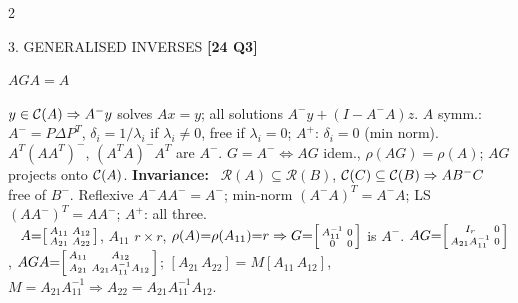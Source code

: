 \documentclass[10pt,a4paper]{article}
\newcommand{\spyq}[1]{{\tiny\color{Yellow}\textbf{[#1]}}}
\newcommand{\sect}[1]{\vspace{2pt}\noindent\colorbox{Blue!78}{\parbox{0.955\columnwidth}%
{\color{white}\bfseries\scriptsize\let\pyq\spyq\strut #1}}\vspace{1pt}\par}
\newcommand{\ssec}[1]{\textbf{\color{BrickRed}#1}\ }
\newcommand{\pyq}[1]{{\tiny\color{BrickRed}\textbf{[#1]}}}
\newcommand{\key}[1]{\par\vspace{0.8pt}\noindent\centerline{\adjustbox{max width=0.96\columnwidth}%
{\colorbox{Yellow!40}{$\displaystyle #1$}}}\vspace{0.8pt}\par}
\newcommand{\Rsp}{\mathcal{R}}\newcommand{\Yb}{\overline{Y}}\newcommand{\xb}{\bar{x}}
\begin{document}
\begin{multicols}{2}
\sect{3. GENERALISED INVERSES \pyq{24 Q3}}
\key{AGA=A}
$y\in\mathcal{C}(A)\Rightarrow A^-y$ solves $Ax{=}y$; all solutions $A^-y{+}(I{-}A^-A)z$.
$A$ symm.: $A^-{=}P\Delta P^T$, $\delta_i{=}1/\lambda_i$ if $\lambda_i{\ne}0$, free if $\lambda_i{=}0$; $A^+$: $\delta_i{=}0$ (min norm).
$A^T(AA^T)^-$, $(A^TA)^-A^T$ are $A^-$. $G{=}A^-\iff AG$ idem., $\rho(AG){=}\rho(A)$; $AG$ projects onto $\mathcal{C}(A)$.
\ssec{Invariance:} $\Rsp(A)\subseteq\Rsp(B)$, $\mathcal{C}(C)\subseteq\mathcal{C}(B)\Rightarrow AB^-C$ free of $B^-$.
Reflexive $A^-AA^-{=}A^-$; min-norm $(A^-A)^T{=}A^-A$; LS $(AA^-)^T{=}AA^-$; $A^+$: all three.\\
\ssec{\pyq{24 Q3}} $A{=}\begin{bsmallmatrix}A_{11}&A_{12}\\A_{21}&A_{22}\end{bsmallmatrix}$, $A_{11}$ $r{\times}r$, $\rho(A){=}\rho(A_{11}){=}r\Rightarrow G{=}\begin{bsmallmatrix}A_{11}^{-1}&0\\0&0\end{bsmallmatrix}$ is $A^-$.
$AG{=}\begin{bsmallmatrix}I_r&0\\A_{21}A_{11}^{-1}&0\end{bsmallmatrix}$, $AGA{=}\begin{bsmallmatrix}A_{11}&A_{12}\\A_{21}&A_{21}A_{11}^{-1}A_{12}\end{bsmallmatrix}$;
$[A_{21}\,A_{22}]{=}M[A_{11}\,A_{12}]$, $M{=}A_{21}A_{11}^{-1}\Rightarrow A_{22}{=}A_{21}A_{11}^{-1}A_{12}$.


\end{multicols}
\end{document}
